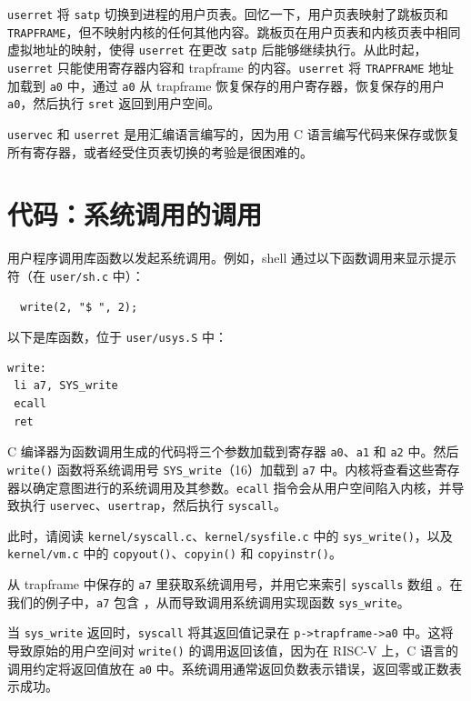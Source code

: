 {\tt userret} 将 {\tt satp} 切换到进程的用户页表。回忆一下，用户页表映射了跳板页和 {\tt TRAPFRAME}，但不映射内核的任何其他内容。跳板页在用户页表和内核页表中相同虚拟地址的映射，使得 {\tt userret} 在更改 {\tt satp} 后能够继续执行。从此时起，{\tt userret} 只能使用寄存器内容和 trapframe 的内容。{\tt userret} 将 {\tt TRAPFRAME} 地址加载到 {\tt a0} 中，通过 {\tt a0} 从 trapframe 恢复保存的用户寄存器，恢复保存的用户 {\tt a0}，然后执行 {\tt sret} 返回到用户空间。

{\tt uservec} 和 {\tt userret} 是用汇编语言编写的，因为用 C 语言编写代码来保存或恢复所有寄存器，或者经受住页表切换的考验是很困难的。

\section{代码：系统调用的调用}

用户程序调用库函数以发起系统调用。例如，shell 通过以下函数调用来显示提示符（在 {\tt user/sh.c} 中）：

\begin{verbatim}
  write(2, "$ ", 2);
\end{verbatim}

以下是库函数，位于 {\tt user/usys.S} 中：

\begin{verbatim}
write:
 li a7, SYS_write
 ecall
 ret
\end{verbatim}

C 编译器为函数调用生成的代码将三个参数加载到寄存器 {\tt a0}、{\tt a1} 和 {\tt a2} 中。然后 {\tt write()} 函数将系统调用号 {\tt SYS\_write}（16）加载到 {\tt a7} 中。内核将查看这些寄存器以确定意图进行的系统调用及其参数。\lstinline{ecall} 指令会从用户空间陷入内核，并导致执行 {\tt uservec}、{\tt usertrap}，然后执行 {\tt syscall}。

此时，请阅读 {\tt kernel/syscall.c}、{\tt kernel/sysfile.c} 中的 {\tt sys\_write()}，以及 {\tt kernel/vm.c} 中的 {\tt copyout()}、{\tt copyin()} 和 {\tt copyinstr()}。

从 trapframe 中保存的 \texttt{a7} 里获取系统调用号，并用它来索引 {\tt syscalls} 数组 。在我们的例子中，\texttt{a7} 包含  ，从而导致调用系统调用实现函数 \lstinline{sys_write}。

当 \lstinline{sys_write} 返回时，\lstinline{syscall} 将其返回值记录在 \lstinline{p->trapframe->a0} 中。这将导致原始的用户空间对 {\tt write()} 的调用返回该值，因为在 RISC-V 上，C 语言的调用约定将返回值放在 {\tt a0} 中。系统调用通常返回负数表示错误，返回零或正数表示成功。

